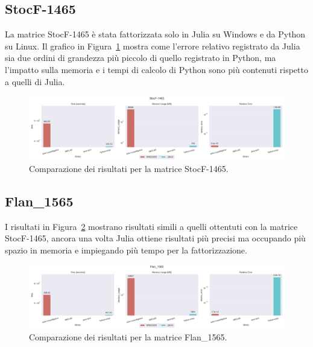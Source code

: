 \documentclass{report}
\begin{document}
            \subsection{StocF-1465}
                La matrice StocF-1465 è stata fattorizzata solo in Julia su 
                Windows e da Python su Linux. Il grafico in 
                Figura~\ref{fig:StocF-1465} mostra come l'errore relativo
                registrato da Julia sia due ordini di grandezza più piccolo di
                quello registrato in Python, ma l'impatto sulla memoria e i 
                tempi di calcolo di Python sono più contenuti rispetto a quelli
                di Julia.
                \begin{figure}[h]
                    \includegraphics[width=\textwidth]{StocF-1465}
                    \caption{Comparazione dei risultati per la matrice StocF-1465.}
                    \label{fig:StocF-1465}
                \end{figure}
            \subsection{Flan\_1565}
                I risultati in Figura~\ref{fig:Flan_1565} mostrano risultati 
                simili a quelli ottentuti con la matrice StocF-1465, ancora una 
                volta Julia ottiene risultati più precisi ma occupando più 
                spazio in memoria e impiegando più tempo per la fattorizzazione.
                \begin{figure}[h]
                    \includegraphics[width=\textwidth]{Flan_1565}
                    \caption{Comparazione dei risultati per la matrice Flan\_1565.}
                    \label{fig:Flan_1565}
                \end{figure}
\end{document}
